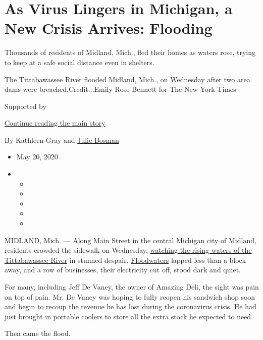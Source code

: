 \hypertarget{as-virus-lingers-in-michigan-a-new-crisis-arrives-flooding}{%
\section{As Virus Lingers in Michigan, a New Crisis Arrives:
Flooding}\label{as-virus-lingers-in-michigan-a-new-crisis-arrives-flooding}}

Thousands of residents of Midland, Mich., fled their homes as waters
rose, trying to keep at a safe social distance even in shelters.

The Tittabawassee River flooded Midland, Mich., on Wednesday after two
area dams were breached.Credit...Emily Rose Bennett for The New York
Times

Supported by

\protect\hyperlink{after-sponsor}{Continue reading the main story}

By Kathleen Gray and
\href{https://www.nytimes3xbfgragh.onion/by/julie-bosman}{Julie Bosman}

\begin{itemize}
\item
  May 20, 2020
\item
  \begin{itemize}
  \item
  \item
  \item
  \item
  \item
  \end{itemize}
\end{itemize}

MIDLAND, Mich. --- Along Main Street in the central Michigan city of
Midland, residents crowded the sidewalk on Wednesday,
\href{https://www.nytimes3xbfgragh.onion/2020/05/20/us/michigan-dams.html}{watching
the rising waters of the Tittabawassee River} in stunned despair.
\href{https://www.nytimes3xbfgragh.onion/2020/07/03/world/asia/china-floods-rain.html}{Floodwaters}
lapped less than a block away, and a row of businesses, their
electricity cut off, stood dark and quiet.

For many, including Jeff De Vaney, the owner of Amazing Deli, the sight
was pain on top of pain. Mr. De Vaney was hoping to fully reopen his
sandwich shop soon and begin to recoup the revenue he has lost during
the coronavirus crisis. He had just brought in portable coolers to store
all the extra stock he expected to need.

Then came the flood.

